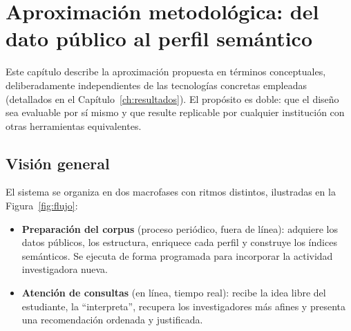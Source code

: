\chapter[Aproximación metodológica]{Aproximación metodológica: del dato público al perfil semántico}
\label{ch:metodologia}

Este capítulo describe la aproximación propuesta en términos conceptuales, deliberadamente independientes de las tecnologías concretas empleadas (detallados en el Capítulo~\ref{ch:resultados}).
El propósito es doble: que el diseño sea evaluable por sí mismo y que resulte replicable por cualquier institución con otras herramientas equivalentes.

\section{Visión general}
\label{sec:met-vision}

El sistema se organiza en dos macrofases con ritmos distintos, ilustradas en la Figura~\ref{fig:flujo}:

\begin{itemize}
    \item \textbf{Preparación del corpus} (proceso periódico, fuera de línea): adquiere los datos públicos, los estructura, enriquece cada perfil y construye los índices semánticos.
    Se ejecuta de forma programada para incorporar la actividad investigadora nueva.
    \item \textbf{Atención de consultas} (en línea, tiempo real): recibe la idea libre del estudiante, la ``interpreta'', recupera los investigadores más afines y presenta una recomendación ordenada y justificada.
\end{itemize}

